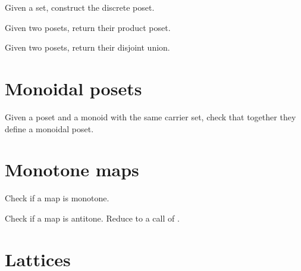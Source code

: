 \begin{gradedexercise}
Given a set, construct the discrete poset.

\end{gradedexercise}


\begin{gradedexercise}
Given two posets, return their product poset.
\end{gradedexercise}
\begin{gradedexercise}
Given two posets, return their disjoint union.

\end{gradedexercise}


\section{Monoidal posets}



\begin{gradedexercise}
Given a poset and a monoid with the same carrier set, check that together they define a monoidal poset.

\end{gradedexercise}


\section{Monotone maps}




\begin{gradedexercise}
Check if a map is monotone.

\end{gradedexercise}


\begin{gradedexercise}
Check if a map is antitone. Reduce to a call of .

\end{gradedexercise}


\section{Lattices}


